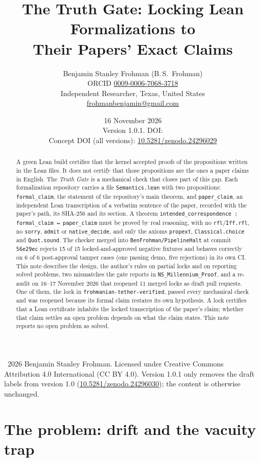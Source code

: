 \documentclass[11pt,a4paper]{article}
\title{The Truth Gate: Locking Lean Formalizations to\\ Their Papers' Exact Claims}
\author{Benjamin Stanley Frohman (B.\,S.\ Frohman)\\
\small ORCID \href{https://orcid.org/0009-0006-7068-3718}{0009-0006-7068-3718}\\
\small Independent Researcher, Texas, United States\\
\small \href{mailto:frohmanbenjamin@gmail.com}{frohmanbenjamin@gmail.com}}
\date{16 November 2026\\[2pt]\small Version 1.0.1. DOI: \reserveddoi\\ \small Concept DOI (all versions): \href{https://doi.org/10.5281/zenodo.24296029}{10.5281/zenodo.24296029}}
\newcommand{\code}[1]{\texttt{#1}}
\begin{document}
\maketitle

\begin{abstract}
A green Lean build certifies that the kernel accepted proofs of the propositions written in the
Lean files. It does not certify that those propositions are the ones a paper claims in English.
The \emph{Truth Gate} is a mechanical check that closes part of this gap. Each formalization
repository carries a file \code{Semantics.lean} with two propositions: \code{formal\_claim}, the
statement of the repository's main theorem, and \code{paper\_claim}, an independent Lean
transcription of a verbatim sentence of the paper, recorded with the paper's path, its SHA-256
and its section. A theorem \code{intended\_correspondence : formal\_claim ↔ paper\_claim} must be
proved by real reasoning, with no \code{rfl}/\code{Iff.rfl}, no \code{sorry}, \code{admit} or
\code{native\_decide}, and only the axioms \code{propext}, \code{Classical.choice} and
\code{Quot.sound}. The checker merged into \code{BenFrohman/PipelineHalt} at commit
\code{56e29ec} rejects 15 of 15 locked-and-approved negative fixtures and behaves correctly on
6 of 6 post-approval tamper cases (one passing demo, five rejections) in its own CI. This note
describes the design, the author's rules on partial locks and on reporting solved problems, two
mismatches the gate reports in \code{NS\_Millennium\_Proof}, and a re-audit on 16--17 November
2026 that reopened 11 merged locks as draft pull requests. One of them, the lock in
\code{frohmanian-tether-verified}, passed every mechanical check and was reopened because its
formal claim restates its own hypothesis. A lock certifies that a Lean certificate inhabits the
locked transcription of the paper's claim; whether that claim settles an open problem depends on
what the claim states. This note reports no open problem as solved.
\end{abstract}

\noindent\small\textcopyright\ 2026 Benjamin Stanley Frohman. Licensed under Creative Commons
Attribution 4.0 International (CC BY 4.0). Version 1.0.1 only removes the draft labels from
version 1.0 (\href{https://doi.org/10.5281/zenodo.24296030}{10.5281/zenodo.24296030}); the content is otherwise
unchanged.\normalsize

\section{The problem: drift and the vacuity trap}
\end{document}
